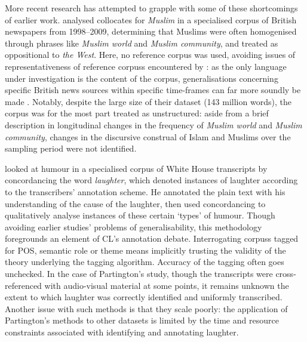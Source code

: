 More recent research has attempted to grapple with some of these shortcomings of earlier work. \textcite{baker_sketching_2012} analysed collocates for \emph{Muslim} in a specialised \gls{corpus} of British newspapers from 1998--2009, determining that Muslims were often homogenised through phrases like \emph{Muslim world} and \emph{Muslim community}, and treated as oppositional to \emph{the West}. Here, no reference \gls{corpus} was used, avoiding issues of representativeness of reference \glspl{corpus} encountered by \textcite{fox_comparison_1993}: as the only language under investigation is the content of the \gls{corpus}, generalisations concerning specific British news sources within specific time\hyp{}frames can far more soundly be made \cite{hoey_lexical_2005}. Notably, despite the large size of their dataset (143 million words), the corpus was for the most part treated as unstructured: aside from a brief description in longitudinal changes in the frequency of \emph{Muslim world} and \emph{Muslim community}, changes in the discursive construal of Islam and Muslims over the sampling period were not identified.

\textcite{partington_double-speak_2011} looked at humour in a specialised \gls{corpus} of White House transcripts by concordancing the word \emph{laughter}, which denoted instances of laughter according to the transcribers' annotation scheme. He annotated the plain text with his understanding of the cause of the laughter, then used concordancing to qualitatively analyse instances of these certain `types' of humour. Though avoiding earlier studies' problems of generalisability, this methodology foregrounds an element of \gls{CL}'s annotation debate. Interrogating \glspl{corpus} tagged for \gls{POS}, semantic role or theme means implicitly trusting the validity of the theory underlying the tagging algorithm. Accuracy of the tagging often goes unchecked. In the case of Partington's study, though the transcripts were cross\hyp{}referenced with audio\hyp{}visual material at some points, it remains unknown the extent to which laughter was correctly identified and uniformly transcribed. Another issue with such methods is that they scale poorly: the application of Partington's methods to other datasets is limited by the time and resource constraints associated with identifying and annotating laughter.


